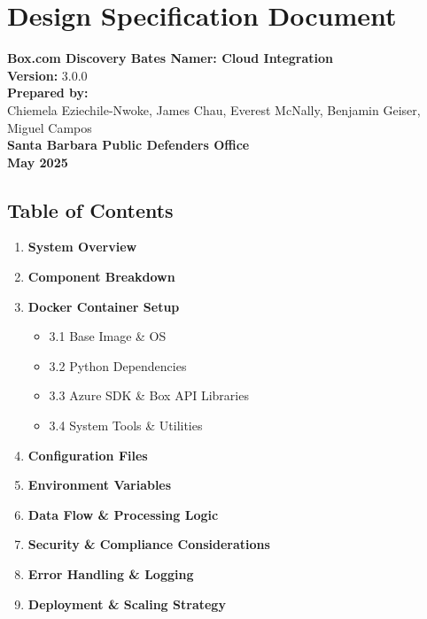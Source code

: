 \documentclass[
]{article}
\author{}
\date{}
\providecommand{\tightlist}{%
  \setlength{\itemsep}{0pt}\setlength{\parskip}{0pt}}
\begin{document}
\hypertarget{design-specification-document}{%
\section{\texorpdfstring{\textbf{Design Specification
Document}}{Design Specification Document}}\label{design-specification-document}}

\textbf{Box.com Discovery Bates Namer: Cloud Integration}\\
\textbf{Version:} 3.0.0\\
\textbf{Prepared by:}\\
Chiemela Eziechile-Nwoke, James Chau, Everest McNally, Benjamin Geiser,
Miguel Campos\\
\textbf{Santa Barbara Public Defender\textquotesingle s Office}\\
\textbf{May 2025}

\hypertarget{table-of-contents}{%
\subsection{\texorpdfstring{\textbf{Table of
Contents}}{Table of Contents}}\label{table-of-contents}}

\begin{enumerate}
\def\labelenumi{\arabic{enumi}.}
\tightlist
\item
  \textbf{System Overview}
\item
  \textbf{Component Breakdown}
\item
  \textbf{Docker Container Setup}

  \begin{itemize}
  \tightlist
  \item
    3.1 Base Image \& OS
  \item
    3.2 Python Dependencies
  \item
    3.3 Azure SDK \& Box API Libraries
  \item
    3.4 System Tools \& Utilities
  \end{itemize}
\item
  \textbf{Configuration Files}
\item
  \textbf{Environment Variables}
\item
  \textbf{Data Flow \& Processing Logic}
\item
  \textbf{Security \& Compliance Considerations}
\item
  \textbf{Error Handling \& Logging}
\item
  \textbf{Deployment \& Scaling Strategy}
\end{enumerate}
\end{document}
